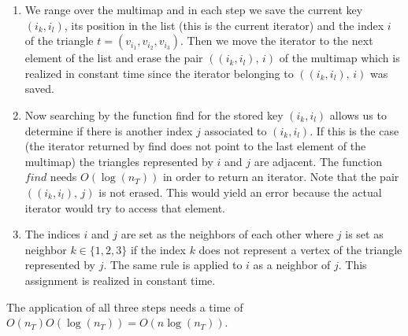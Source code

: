 \documentclass[10pt]{article}
\begin{document}
 \begin{enumerate}
 	\item 
 	We range over the multimap and in each step we save the current key $ (i_k,i_l) $, its position in the list (this is the current iterator) and the index $ i $ of the triangle $ t = (v_{i_1},v_{i_2},v_{i_3})  $. Then we move the iterator to the next element of the list and erase the pair $ ( (i_k,i_l), \, i) $ of the multimap which is realized in constant time since the iterator belonging to $ ( (i_k,i_l), \, i) $ was saved. 
 	\item 
 	Now searching by the function {\ttfamily find } for the stored key $ (i_k,i_l) $ allows us to determine if there is another index $ j $ associated to $ (i_k,i_l) $. If this is the case (the iterator returned by find does not point to the last element of the multimap) the triangles represented by $i$ and $j$ are adjacent. The function  $ find $ needs $ O(\log(n_T)) $ in order to return an iterator. 
 	Note that the pair $ ( (i_k,i_l), \, j) $ is not erased. This would yield an error because the actual iterator would try to access that element. 
 	\item 
 	The indices $ i $ and $ j $ are set as the neighbors of each other where $ j $ is set as neighbor $ k \in \{1,2,3\} $ if the index $k$ does not represent a vertex of the triangle represented by $ j $. The same rule is applied to $ i $ as a neighbor of $ j $. 
 	This assignment is realized in constant time. 
  \end{enumerate}
The application of all three steps needs a time of $ O(n_T)O(\log(n_T)) = O(n\log(n_T)) $. 
\end{document}
